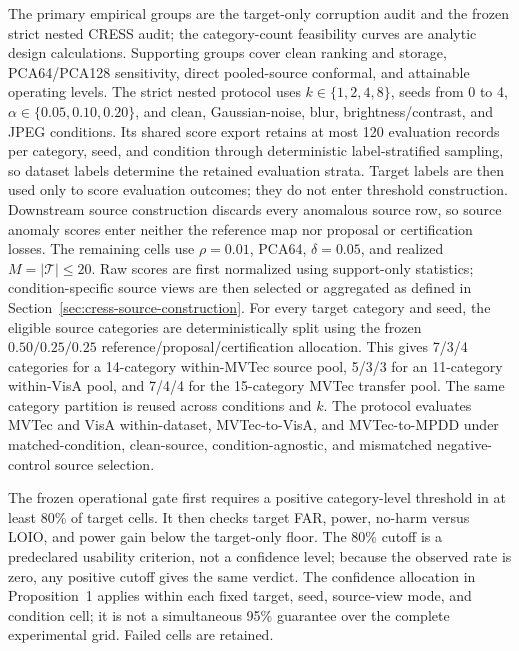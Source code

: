 The primary empirical groups are the target-only corruption audit and the frozen strict nested CRESS audit; the category-count feasibility curves are analytic design calculations. Supporting groups cover clean ranking and storage, PCA64/PCA128 sensitivity, direct pooled-source conformal, and attainable operating levels. The strict nested protocol uses $k\in\{1,2,4,8\}$, seeds from 0 to 4, $\alpha\in\{0.05,0.10,0.20\}$, and clean, Gaussian-noise, blur, brightness/contrast, and JPEG conditions. Its shared score export retains at most 120 evaluation records per category, seed, and condition through deterministic label-stratified sampling, so dataset labels determine the retained evaluation strata. Target labels are then used only to score evaluation outcomes; they do not enter threshold construction. Downstream source construction discards every anomalous source row, so source anomaly scores enter neither the reference map nor proposal or certification losses. The remaining cells use $\rho=0.01$, PCA64, $\delta=0.05$, and realized $M=|\mathcal T|\leq20$. Raw scores are first normalized using support-only statistics; condition-specific source views are then selected or aggregated as defined in Section~\ref{sec:cress-source-construction}. For every target category and seed, the eligible source categories are deterministically split using the frozen $0.50/0.25/0.25$ reference/proposal/certification allocation. This gives 7/3/4 categories for a 14-category within-MVTec source pool, 5/3/3 for an 11-category within-VisA pool, and 7/4/4 for the 15-category MVTec transfer pool. The same category partition is reused across conditions and $k$. The protocol evaluates MVTec and VisA within-dataset, MVTec-to-VisA, and MVTec-to-MPDD under matched-condition, clean-source, condition-agnostic, and mismatched negative-control source selection.

The frozen operational gate first requires a positive category-level threshold in at least 80\% of target cells. It then checks target FAR, power, no-harm versus LOIO, and power gain below the target-only floor. The 80\% cutoff is a predeclared usability criterion, not a confidence level; because the observed rate is zero, any positive cutoff gives the same verdict. The confidence allocation in Proposition~1 applies within each fixed target, seed, source-view mode, and condition cell; it is not a simultaneous 95\% guarantee over the complete experimental grid. Failed cells are retained.

